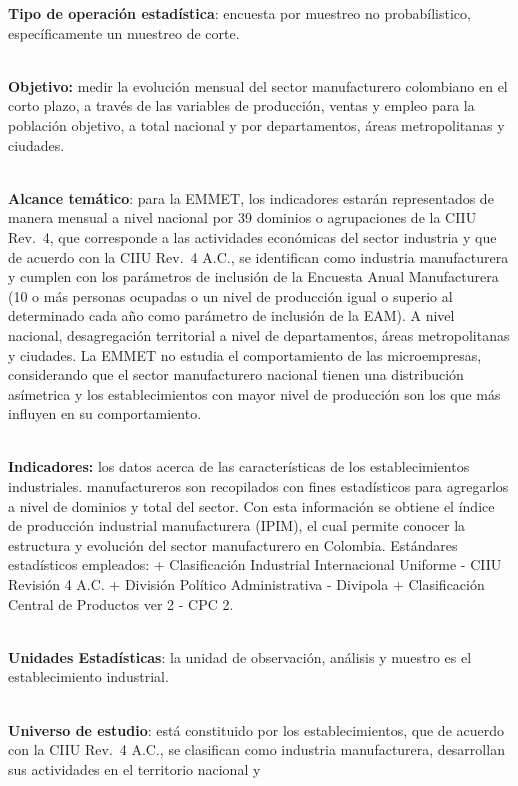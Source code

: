 \documentclass[
]{article}
\begin{document}
\textbf{Tipo de operación estadística}: encuesta por muestreo no
probabílistico, específicamente un muestreo de corte.\\
\strut \\
\textbf{Objetivo:} medir la evolución mensual del sector manufacturero
colombiano en el corto plazo, a través de las variables de producción,
ventas y empleo para la población objetivo, a total nacional y por
departamentos, áreas metropolitanas y ciudades.\\
\strut \\
\textbf{Alcance temático}: para la EMMET, los indicadores estarán
representados de manera mensual a nivel nacional por 39 dominios o
agrupaciones de la CIIU Rev.~4, que corresponde a las actividades
económicas del sector industria y que de acuerdo con la CIIU Rev.~4
A.C., se identifican como industria manufacturera y cumplen con los
parámetros de inclusión de la Encuesta Anual Manufacturera (10 o más
personas ocupadas o un nivel de producción igual o superio al
determinado cada año como parámetro de inclusión de la EAM). A nivel
nacional, desagregación territorial a nivel de departamentos, áreas
metropolitanas y ciudades. La EMMET no estudia el comportamiento de las
microempresas, considerando que el sector manufacturero nacional tienen
una distribución asímetrica y los establecimientos con mayor nivel de
producción son los que más influyen en su comportamiento.\\
\strut \\
\textbf{Indicadores:} los datos acerca de las características de los
establecimientos industriales. manufactureros son recopilados con fines
estadísticos para agregarlos a nivel de dominios y total del sector. Con
esta información se obtiene el índice de producción industrial
manufacturera (IPIM), el cual permite conocer la estructura y evolución
del sector manufacturero en Colombia. Estándares estadísticos empleados:
+ Clasificación Industrial Internacional Uniforme - CIIU Revisión 4 A.C.
+ División Político Administrativa - Divipola + Clasificación Central de
Productos ver 2 - CPC 2.\\
\strut \\
\textbf{Unidades Estadísticas}: la unidad de observación, análisis y
muestro es el establecimiento industrial.\\
\strut \\
\textbf{Universo de estudio}: está constituido por los establecimientos,
que de acuerdo con la CIIU Rev.~4 A.C., se clasifican como industria
manufacturera, desarrollan sus actividades en el territorio nacional y
\end{document}

